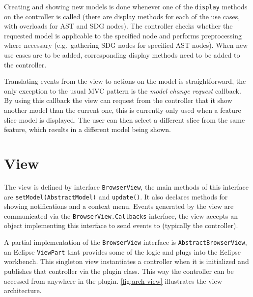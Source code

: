 Creating and showing new models is done whenever one of the \lstinline|display| methods on the controller is called 
(there are display methods for each of the use cases, with overloads for AST and SDG nodes). The controller checks 
whether the requested model is applicable to the specified node and performs preprocessing where necessary (e.g.\ 
gathering SDG nodes for specified AST nodes). When new use cases are to be added, corresponding display methods need to 
be added to the controller.

Translating events from the view to actions on the model is straightforward, the only exception to the usual MVC 
pattern is the \emph{model change request} callback. By using this callback the view can request from the controller 
that it show another model than the current one, this is currently only used when a feature slice model is displayed. 
The user can then select a different slice from the same feature, which results in a different model being shown.


\section{View}

The view is defined by interface \lstinline|BrowserView|, the main methods of this interface are 
\lstinline|setModel(AbstractModel)| and \lstinline|update()|. It also declares methods for showing notifications and a 
context menu. Events generated by the view are communicated via the \lstinline|BrowserView.Callbacks| interface, the 
view accepts an object implementing this interface to send events to (typically the controller).

A partial implementation of the \lstinline|BrowserView| interface is \lstinline|AbstractBrowserView|, an Eclipse 
\lstinline|ViewPart| that provides some of the logic and plugs into the Eclipse workbench. This singleton view 
instantiates a controller when it is initialized and publishes that controller via the plugin class. This way the 
controller can be accessed from anywhere in the plugin. \autoref{fig:arch-view} illustrates the view architecture.

